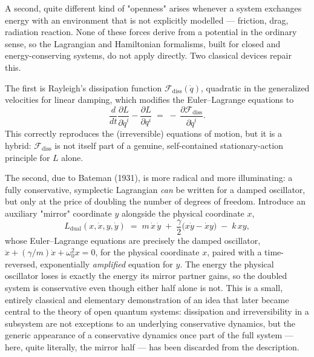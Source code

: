 A second, quite different kind of "openness" arises whenever a
system exchanges energy with an environment that is not explicitly
modelled --- friction, drag, radiation reaction. None of these
forces derive from a potential in the ordinary sense, so the
Lagrangian and Hamiltonian formalisms, built for closed and
energy-conserving systems, do not apply directly. Two classical
devices repair this.

The first is Rayleigh's dissipation function $\mathcal
F_{\mathrm{diss}}(\dot q)$, quadratic in the generalized velocities
for linear damping, which modifies the Euler--Lagrange equations to
\begin{equation}
  \frac{d}{dt}\frac{\partial L}{\partial \dot q^i}
  - \frac{\partial L}{\partial q^i}
  \;=\; -\,\frac{\partial \mathcal F_{\mathrm{diss}}}{\partial \dot
  q^i}.
  \label{rayleigh}
\end{equation}
This correctly reproduces the (irreversible) equations of motion,
but it is a hybrid: $\mathcal F_{\mathrm{diss}}$ is not itself part
of a genuine, self-contained stationary-action principle for $L$
alone.

The second, due to Bateman (1931), is more radical and more
illuminating: a fully conservative, symplectic Lagrangian \emph{can}
be written for a damped oscillator, but only at the price of
doubling the number of degrees of freedom. Introduce an auxiliary
"mirror" coordinate $y$ alongside the physical coordinate $x$,
\begin{equation}
  L_{\mathrm{dual}}(x,\dot x,y,\dot y) \;=\;
  m\,\dot x\,\dot y \;+\; \frac{\gamma}{2}\bigl(x\dot y - \dot x
  y\bigr) \;-\; k\,xy ,
  \label{bateman}
\end{equation}
whose Euler--Lagrange equations are precisely the damped oscillator,
$\ddot x + (\gamma/m)\dot x + \omega_0^2 x = 0$, for the physical
coordinate $x$, paired with a time-reversed, exponentially
\emph{amplified} equation for $y$. The energy the
physical oscillator loses is exactly the energy its mirror partner
gains, so the doubled system is conservative even though either half
alone is not. This is a small, entirely classical and elementary
demonstration of an idea that later became central to the theory of
open quantum systems: dissipation and irreversibility in a subsystem
are not exceptions to an underlying conservative dynamics, but the
generic appearance of a conservative dynamics once part of the full
system --- here, quite literally, the mirror half --- has been
discarded from the description.


